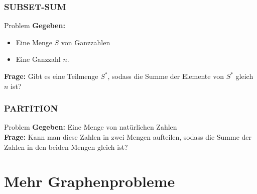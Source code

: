 \begin{frame}
\frametitle{SUBSET-SUM}
\begin{block}{Problem}
\textbf{Gegeben:}
\begin{itemize}
 \item Eine Menge $S$ von Ganzzahlen
 \item Eine Ganzzahl $n$.
\end{itemize}
\textbf{Frage:}
Gibt es eine Teilmenge $S^*$, sodass die Summe der Elemente von $S^*$ gleich $n$ ist?
\end{block}
\end{frame}
\begin{frame}
\frametitle{PARTITION}
\begin{block}{Problem}
\textbf{Gegeben:} Eine Menge von natürlichen Zahlen\\
\textbf{Frage:} Kann man diese Zahlen in zwei Mengen aufteilen, sodass die Summe der Zahlen in den beiden Mengen gleich ist?
\end{block}
\end{frame}


\section{Mehr Graphenprobleme}
\subsection{}

